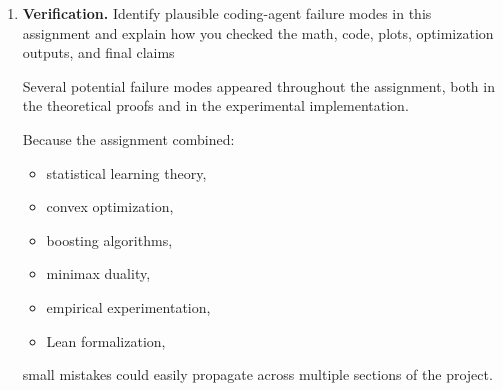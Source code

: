 \documentclass[11pt]{article}
\begin{document}
\begin{enumerate}
\begin{solutionbox}
The verification workflow therefore acted as a bridge between:
\begin{itemize}
    \item mathematical correctness,
    \item algorithmic correctness,
    \item experimental reproducibility.
\end{itemize}

\medskip

Overall, this workflow helped ensure that:
\begin{itemize}
    \item the implementation faithfully matched the theory,
    \item experimental observations were trustworthy,
    \item comparisons against theoretical predictions were meaningful,
    \item debugging could occur systematically rather than heuristically.
\end{itemize}

Developing this verification-oriented approach was one of the most useful practical skills gained during the assignment because it emphasized that in theoretical machine learning experiments, correctness depends not only on the mathematics, but also on rigorous validation of the computational pipeline.

\end{solutionbox}

\item \textbf{Verification.}
Identify plausible coding-agent failure modes in this assignment and explain how you 
checked the math, code, plots, optimization outputs, and final claims
\begin{solutionbox}

Several potential failure modes appeared throughout the assignment, both in the theoretical proofs and in the experimental implementation.

Because the assignment combined:
\begin{itemize}
    \item statistical learning theory,
    \item convex optimization,
    \item boosting algorithms,
    \item minimax duality,
    \item empirical experimentation,
    \item Lean formalization,
\end{itemize}
small mistakes could easily propagate across multiple sections of the project.


\end{solutionbox}
\end{enumerate}
\end{document}

